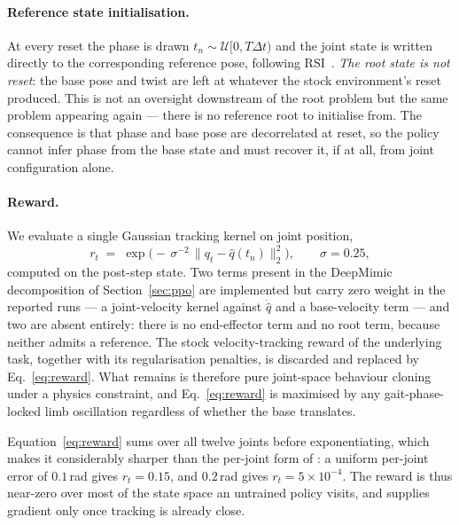 \documentclass{article}
\theoremstyle{plain}
\theoremstyle{definition}
\theoremstyle{remark}
\begin{document}
\paragraph{Reference state initialisation.} At every reset the phase is drawn
$t_n \sim \mathcal{U}[0, T\Delta t)$ and the joint state is written directly to
the corresponding reference pose, following
RSI~\citep{peng2018deepmimic}. \emph{The root state is not reset}: the base
pose and twist are left at whatever the stock environment's reset produced.
This is not an oversight downstream of the root problem but the same problem
appearing again --- there is no reference root to initialise from. The
consequence is that phase and base pose are decorrelated at reset, so the
policy cannot infer phase from the base state and must recover it, if at all,
from joint configuration alone.
 
\paragraph{Reward.} We evaluate a single Gaussian tracking kernel on joint
position,
\begin{equation}
    r_t \;=\; \exp\!\Big( -\,\sigma^{-2}\,
              \big\lVert q_t - \hat{q}(t_n) \big\rVert_2^2 \Big),
    \qquad \sigma = 0.25,
    \label{eq:reward}
\end{equation}
computed on the post-step state. Two terms present in the DeepMimic
decomposition of Section~\ref{sec:ppo} are implemented but carry zero weight in
the reported runs --- a joint-velocity kernel against $\dot{\hat{q}}$ and a
base-velocity term --- and two are absent entirely: there is no end-effector
term and no root term, because neither admits a reference. The stock
velocity-tracking reward of the underlying task, together with its
regularisation penalties, is discarded and replaced by
Eq.~\eqref{eq:reward}. What remains is therefore pure joint-space behaviour
cloning under a physics constraint, and Eq.~\eqref{eq:reward} is maximised by
any gait-phase-locked limb oscillation regardless of whether the base
translates.
 
Equation~\eqref{eq:reward} sums over all twelve joints before exponentiating,
which makes it considerably sharper than the per-joint form of
\citet{peng2018deepmimic}: a uniform per-joint error of $0.1$\,rad gives
$r_t = 0.15$, and $0.2$\,rad gives $r_t = 5 \times 10^{-4}$. The reward is thus
near-zero over most of the state space an untrained policy visits, and supplies
gradient only once tracking is already close.
 
\end{document}
